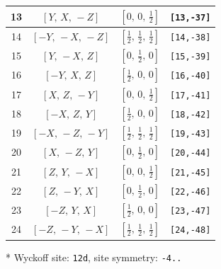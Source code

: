 \documentclass[fleqn,8pt]{jsarticle}
\begin{document}
\begin{longtable}{cccc}
13 & $\left[ Y,\, X,\, - Z \right]$ & $\left[ 0,\, 0,\, \frac{1}{2} \right]$ & {\tt [13,-37]} \\ \hline
14 & $\left[ - Y,\, - X,\, - Z \right]$ & $\left[ \frac{1}{2},\, \frac{1}{2},\, \frac{1}{2} \right]$ & {\tt [14,-38]} \\ \hline
15 & $\left[ Y,\, - X,\, Z \right]$ & $\left[ 0,\, \frac{1}{2},\, 0 \right]$ & {\tt [15,-39]} \\ \hline
16 & $\left[ - Y,\, X,\, Z \right]$ & $\left[ \frac{1}{2},\, 0,\, 0 \right]$ & {\tt [16,-40]} \\ \hline
17 & $\left[ X,\, Z,\, - Y \right]$ & $\left[ 0,\, 0,\, \frac{1}{2} \right]$ & {\tt [17,-41]} \\ \hline
18 & $\left[ - X,\, Z,\, Y \right]$ & $\left[ \frac{1}{2},\, 0,\, 0 \right]$ & {\tt [18,-42]} \\ \hline
19 & $\left[ - X,\, - Z,\, - Y \right]$ & $\left[ \frac{1}{2},\, \frac{1}{2},\, \frac{1}{2} \right]$ & {\tt [19,-43]} \\ \hline
20 & $\left[ X,\, - Z,\, Y \right]$ & $\left[ 0,\, \frac{1}{2},\, 0 \right]$ & {\tt [20,-44]} \\ \hline
21 & $\left[ Z,\, Y,\, - X \right]$ & $\left[ 0,\, 0,\, \frac{1}{2} \right]$ & {\tt [21,-45]} \\ \hline
22 & $\left[ Z,\, - Y,\, X \right]$ & $\left[ 0,\, \frac{1}{2},\, 0 \right]$ & {\tt [22,-46]} \\ \hline
23 & $\left[ - Z,\, Y,\, X \right]$ & $\left[ \frac{1}{2},\, 0,\, 0 \right]$ & {\tt [23,-47]} \\ \hline
24 & $\left[ - Z,\, - Y,\, - X \right]$ & $\left[ \frac{1}{2},\, \frac{1}{2},\, \frac{1}{2} \right]$ & {\tt [24,-48]} \\
\end{longtable}
* Wyckoff site: {\tt 12d}, site symmetry: {\tt -4..}
\renewcommand{\arraystretch}{1.2}
\end{document}
